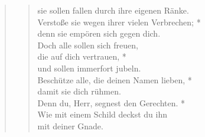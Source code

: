 \begin{quote}
\begin{verse}
\vin sie sollen fallen durch ihre eigenen Ränke.\\  
Verstoße sie wegen ihrer vielen Verbrechen; *\\  
denn sie empören sich gegen dich.\\ 
\vin Doch alle sollen sich freuen, \\ 
\vin die auf dich vertrauen, *\\ 
\vin und sollen immerfort jubeln.\\  
Beschütze alle, die deinen Namen lieben, *\\  
damit sie dich rühmen.\\ 
\vin Denn du, Herr, segnest den Gerechten. *\\ 
\vin Wie mit einem Schild deckst du ihn\\ 
\vin mit deiner Gnade.\\ 
\end{verse}
\end{quote}
\vspace{1cm}


